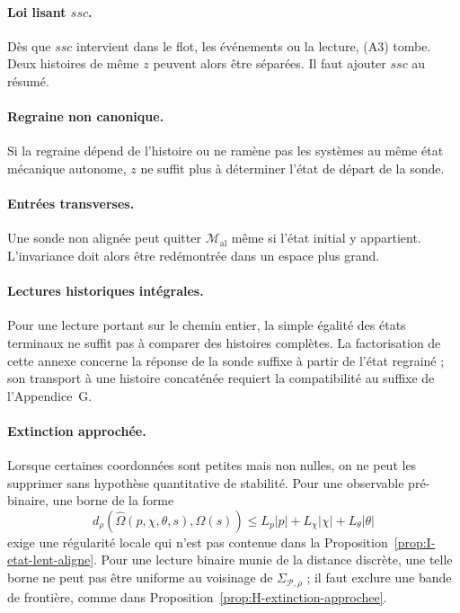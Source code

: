 \paragraph{Loi lisant $ssc$.}
Dès que $ssc$ intervient dans le flot, les événements ou la lecture,
(A3) tombe. Deux histoires de même $z$ peuvent alors être séparées. Il
faut ajouter $ssc$ au résumé.

\paragraph{Regraine non canonique.}
Si la regraine dépend de l'histoire ou ne ramène pas les systèmes au
même état mécanique autonome, $z$ ne suffit plus à déterminer l'état de
départ de la sonde.

\paragraph{Entrées transverses.}
Une sonde non alignée peut quitter $\mathcal M_{\mathrm{al}}$ même si
l'état initial y appartient. L'invariance doit alors être redémontrée
dans un espace plus grand.

\paragraph{Lectures historiques intégrales.}
Pour une lecture portant sur le chemin entier, la simple égalité des
états terminaux ne suffit pas à comparer des histoires complètes. La
factorisation de cette annexe concerne la réponse de la sonde suffixe à
partir de l'état regrainé ; son transport à une histoire concaténée
requiert la compatibilité au suffixe de l'Appendice~G.

\paragraph{Extinction approchée.}
Lorsque certaines coordonnées sont petites mais non nulles, on ne peut
les supprimer sans hypothèse quantitative de stabilité. Pour une observable pré-binaire, une borne de la
forme
\[
d_\rho\!\left(
\widehat\Omega(p,\chi,\theta,s),
\Omega(s)
\right)
\le
L_p|p|+L_\chi|\chi|+L_\theta|\theta|
\]
exige une régularité locale qui n'est pas contenue dans la Proposition~\ref{prop:I-etat-lent-aligne}. Pour une lecture binaire munie de la distance discrète, une telle
borne ne peut pas être uniforme au voisinage de
$\Sigma_{\mathcal P,\rho}$ ; il faut exclure une bande de frontière,
comme dans Proposition~\ref{prop:H-extinction-approchee}.

